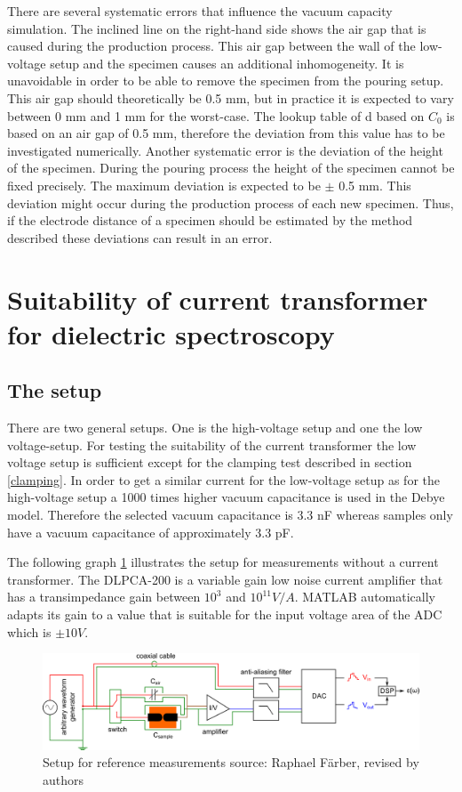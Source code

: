  There are several systematic errors that influence the vacuum capacity simulation. The inclined line on the right-hand side shows the air gap that is caused during the production process. This air gap between the wall of the low-voltage setup and the specimen causes an additional inhomogeneity. It is unavoidable in order to be able to remove the specimen from the pouring setup. This air gap should theoretically be 0.5 mm, but in practice it is expected to vary between 0 mm and 1 mm for the worst-case. The lookup table of d based on $C_0$ is based on an air gap of 0.5 mm, therefore the deviation from this value has to be investigated numerically.
Another systematic error is the deviation of the height of the specimen. During  the pouring process the height of the specimen cannot be fixed precisely. The maximum deviation is expected to be $\pm$ 0.5 mm. This deviation might occur during the production process of each new specimen. Thus, if the electrode distance of a specimen should be estimated by the method described these deviations can result in an error. 
 
\section{Suitability of current transformer for dielectric spectroscopy}
\subsection{The setup}
There are two general setups. One is the high-voltage setup and one the low voltage-setup. For testing the suitability of the current transformer the low voltage setup is sufficient except for the clamping test described in section \ref{clamping}. In order to get a similar current for the low-voltage setup as for the high-voltage setup a 1000 times higher vacuum capacitance is used in the Debye model. Therefore the selected vacuum capacitance is 3.3 nF whereas samples only have a vacuum capacitance of approximately 3.3 pF.  

The following graph \ref{sec.setup_amplifier} illustrates the setup for measurements without a current transformer. The DLPCA-200 is a variable gain low noise current amplifier that has a transimpedance gain between $10^3$ and $10^{11} V/A$. MATLAB automatically adapts its gain to a value that is suitable for the input voltage area of the ADC which is $\pm 10V$. 

\begin{figure}[htbp]
	\centering
	\includegraphics[width=\textwidth]{figures/Method/setup/setup_amplifier}		
	\caption[Kurze Abbildungsbeschreibung]{Setup for reference measurements {source: Raphael F\"arber, revised by authors}} 
	\label{sec.setup_amplifier}

\end{figure}

